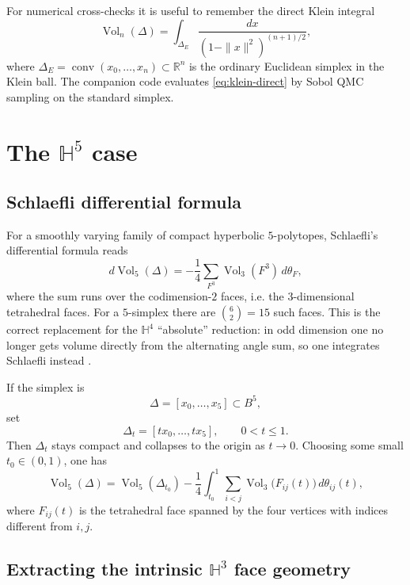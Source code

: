 \documentclass[11pt]{article}
\newcommand{\Hh}{\mathbb{H}}
\newcommand{\Rr}{\mathbb{R}}
\newcommand{\Vol}{\operatorname{Vol}}
\newcommand{\conv}{\operatorname{conv}}
\begin{document}
For numerical cross-checks it is useful to remember the direct Klein integral
\begin{equation}
\label{eq:klein-direct}
\Vol_n(\Delta)=\int_{\Delta_E}\frac{dx}{(1-\|x\|^2)^{(n+1)/2}},
\end{equation}
where $\Delta_E=\conv(x_0,\dots,x_n)\subset \Rr^n$ is the ordinary Euclidean simplex in the Klein
ball.  The companion code evaluates \eqref{eq:klein-direct} by Sobol QMC sampling on the standard
simplex.

\section{The $\Hh^5$ case}

\subsection*{Schlaefli differential formula}

For a smoothly varying family of compact hyperbolic $5$-polytopes,
Schlaefli's differential formula reads
\begin{equation}
\label{eq:schlafli-5}
 d\Vol_5(\Delta)
 =-
 \frac{1}{4}
 \sum_{F^3}
 \Vol_3(F^3)\,d\theta_F,
\end{equation}
where the sum runs over the codimension-$2$ faces, i.e. the $3$-dimensional tetrahedral faces.
For a $5$-simplex there are $\binom{6}{2}=15$ such faces.  This is the correct replacement for the
$\Hh^4$ ``absolute'' reduction: in odd dimension one no longer gets volume directly from the
alternating angle sum, so one integrates Schlaefli instead \cite{Kohno,Heckman}.

If the simplex is
\[
\Delta=[x_0,\dots,x_5]\subset B^5,
\]
set
\[
\Delta_t=[tx_0,\dots,tx_5],\qquad 0<t\le 1.
\]
Then $\Delta_t$ stays compact and collapses to the origin as $t\to 0$.  Choosing some small
$t_0\in(0,1)$, one has
\begin{equation}
\label{eq:h5-radial}
\Vol_5(\Delta)
=
\Vol_5(\Delta_{t_0})
-
\frac14
\int_{t_0}^{1}
\sum_{i<j}
\Vol_3\bigl(F_{ij}(t)\bigr)
\,d\theta_{ij}(t),
\end{equation}
where $F_{ij}(t)$ is the tetrahedral face spanned by the four vertices with indices different from
$i,j$.

\subsection*{Extracting the intrinsic $\Hh^3$ face geometry}
\end{document}
